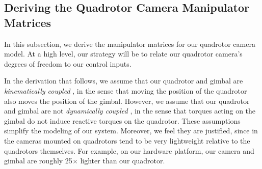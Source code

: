 % 







\subsection{Deriving the Quadrotor Camera Manipulator Matrices}
\label{sec:ch2:manipulator_detail}

In this subsection, we derive the manipulator matrices for our quadrotor camera model.
At a high level, our strategy will be to relate our quadrotor camera's degrees of freedom to our control inputs.

In the derivation that follows, we assume that our quadrotor and gimbal are \emph{kinematically coupled} \cite{kondak:2013}, in the sense that moving the position of the quadrotor also moves the position of the gimbal. However, we assume that our quadrotor and gimbal are not \emph{dynamically coupled} \cite{kondak:2013}, in the sense that torques acting on the gimbal do not induce reactive torques on the quadrotor.
These assumptions simplify the modeling of our system. Moreover, we feel they are justified, since in the cameras mounted on quadrotors tend to be very lightweight relative to the quadrotors themselves. For example, on our hardware platform, our camera and gimbal are roughly 25$\times$ lighter than our quadrotor.

